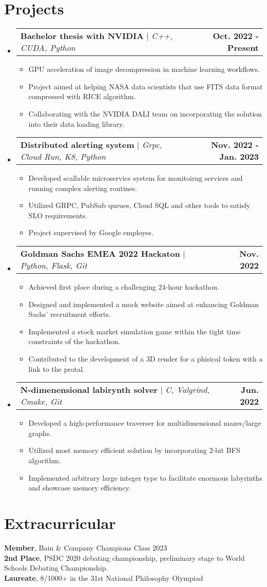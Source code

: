 \documentclass[letterpaper,11pt]{article}
\makeatletter
\newcommand{\resumeItem}[1]{
  \item\small{
    {#1 \vspace{-2pt}}
  }
}
\newcommand{\resumeProjectHeading}[2]{
    \item
    \begin{tabular*}{1.001\textwidth}{l@{\extracolsep{\fill}}r}
      \small#1 & \textbf{\small #2}\\
    \end{tabular*}\vspace{-7pt}
}
\newcommand{\resumeSubHeadingListStart}{\begin{itemize}[leftmargin=0.0in, label={}]}
\newcommand{\resumeSubHeadingListEnd}{\end{itemize}}
\newcommand{\resumeItemListStart}{\begin{itemize}}
\newcommand{\resumeItemListEnd}{\end{itemize}\vspace{-5pt}}
\makeatother
\begin{document}
\section{Projects}
\vspace{-5pt}
\resumeSubHeadingListStart
\resumeProjectHeading
{\textbf{Bachelor thesis with NVIDIA} $|$ \emph{C++, CUDA, Python}}{Oct. 2022 - Present}
\resumeItemListStart
\resumeItem{GPU acceleration of image decompression in machine learning workflows.}
\resumeItem{Project aimed at helping NASA data scientists that use FITS data format compressed with RICE algorithm.}
\resumeItem{Collaborating with the NVIDIA DALI team on incorporating the solution into their data loading library. }
\resumeItemListEnd
\vspace{-13pt}
\resumeProjectHeading
{\textbf{Distributed alerting system} $|$ \emph{Grpc, Cloud Run, K8, Python}}{Nov. 2022 - Jan. 2023}
\resumeItemListStart
\resumeItem{Developed scallable microservice system for monitoirng services and running complex alerting routines.}
\resumeItem{Utilized GRPC, PubSub queues, Cloud SQL and other tools to satisfy SLO requirements.}
\resumeItem{Project supervised by Google employes.}
\resumeItemListEnd
\vspace{-13pt}
\resumeProjectHeading
{\textbf{Goldman Sachs EMEA 2022 Hackaton} $|$ \emph{Python, Flask, Git}}{Nov. 2022}
\resumeItemListStart
\resumeItem{Achieved first place during a challenging 24-hour hackathon.}
\resumeItem{Designed and implemented a mock website aimed at enhancing Goldman Sachs' recruitment efforts.}
\resumeItem{Implemented a stock market simulation game within the tight time constraints of the hackathon.}
\resumeItem{Contributed to the development of a 3D render for a phisical token with a link to the protal.}
\resumeItemListEnd
\vspace{-13pt}
\resumeProjectHeading
{\textbf{N-dimenensional labirynth solver} $|$ \emph{C, Valgrind, Cmake,  Git}}{Jun. 2022}
\resumeItemListStart
\resumeItem{Developed a high-performance traverser for multidimensional mazes/large graphs.}
\resumeItem{Utilized most memory efficient solution by incorporating 2-bit BFS algorithm.}
\resumeItem{Implemented arbitrary large integer type to facilitate enormous labyrinths and showcase memory efficiency.}
\resumeItemListEnd
\resumeSubHeadingListEnd
\vspace{-16pt}

\section{Extracurricular}
\begin{itemize}[leftmargin=0.15in, label={}]
  \small{\item{
                \textbf{Member}{, Bain \& Company Champions Class 2023} \\
                \textbf{2nd Place}{, PSDC 2020 debating championship, preliminary stage to World Schools Debating Championship.} \\
                \textbf{Laureate}{, 8/1000+ in the 31st National Philosophy Olympiad} \\
          }}
\end{itemize}
\vspace{-16pt}
\end{document}
